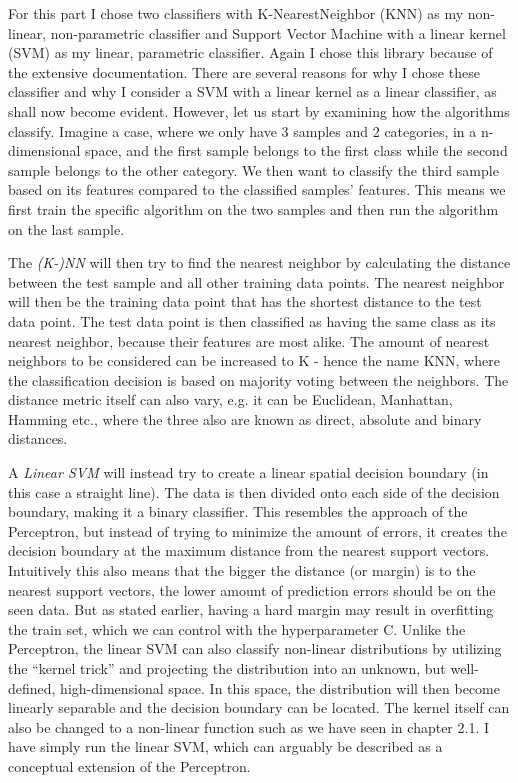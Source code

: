 \documentclass{article}
\theoremstyle{plain}
\theoremstyle{nonumberplain}
\begin{document}
For this part I chose two classifiers with K-NearestNeighbor (KNN) as my non-linear, non-parametric classifier and Support Vector Machine with a linear kernel (SVM) as my linear, parametric classifier.
Again I chose this library because of the extensive documentation.
There are several reasons for why I chose these classifier and why I consider a SVM with a linear kernel as a linear classifier, as shall now become evident.
However, let us start by examining how the algorithms classify.
Imagine a case, where we only have 3 samples and 2 categories, in a n-dimensional space, and the first sample belongs to the first class while the second sample belongs to the other category.
We then want to classify the third sample based on its features compared to the classified samples' features. This means we first train the specific algorithm on the two samples and then run the algorithm on the last sample. \medskip

The \textit{(K-)NN} will then try to find the nearest neighbor by calculating the distance between the test sample and all other training data points. The nearest neighbor will then be the training data point that has the shortest distance to the test data point. The test data point is then classified as having the same class as its nearest neighbor, because their features are most alike.
The amount of nearest neighbors to be considered can be increased to K - hence the name KNN, where the classification decision is based on majority voting between the neighbors. 
The distance metric itself can also vary, e.g. it can  be Euclidean, Manhattan, Hamming etc., where the three also are known as direct, absolute and binary distances.

A \textit{Linear SVM} will instead try to create a linear spatial decision boundary (in this case a straight line). The data is then divided onto each side of the decision boundary, making it a binary classifier. This resembles the approach of the Perceptron, but instead of trying to minimize the amount of errors, it creates the decision boundary at the maximum distance from the nearest support vectors.
Intuitively this also means that the bigger the distance (or margin) is to the nearest support vectors, the lower amount of prediction errors should be on the seen data.
But as stated earlier, having a hard margin may result in overfitting the train set, which we can control with the hyperparameter C.
Unlike the Perceptron, the linear SVM can also classify non-linear distributions by utilizing the ``kernel trick'' and projecting the distribution into an unknown, but well-defined, high-dimensional space. In this space, the distribution will then become linearly separable and the decision boundary can be located.
The kernel itself can also be changed to a non-linear function such as we have seen in chapter 2.1.
I have simply run the linear SVM, which can arguably be described as a conceptual extension of the Perceptron. \medskip
\end{document}
